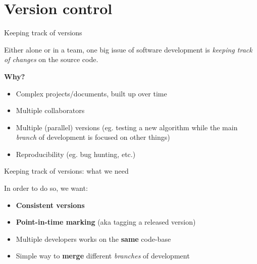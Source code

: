 
\section{Version control}

\begin{frame}[fragile]{Keeping track of versions}

Either alone or in a team, one big issue of software development is \textit{keeping
track of changes} on the source code.

\vspace{1em}

\textbf{Why?}
\begin{itemize}
\item Complex projects/documents, built up over time
\item Multiple collaborators
\item Multiple (parallel) versions (eg. testing a new algorithm while the main
\textit{branch} of development is focused on other things)
\item Reproducibility (eg. bug hunting, etc.)
\end{itemize}
\end{frame}


\begin{frame}[fragile]{Keeping track of versions: what we need}

In order to do so, we want:

\begin{itemize}
\item \textbf{Consistent versions}
\item \textbf{Point-in-time marking} (aka tagging a released version)
\item Multiple developers works on the \textbf{same} code-base
\item Simple way to \textbf{merge} different \textit{branches} of development
\end{itemize}
\end{frame}


